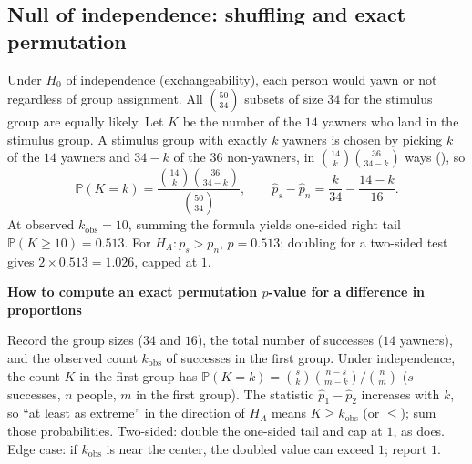 \documentclass[10pt]{scrartcl}
\newenvironment{howto}[1]{\begin{mdframed}[style=howtostyle]{\color{NavyBlue}\textbf{#1}}\par\vspace{2pt}}{\end{mdframed}}
\begin{document}
\subsection{Null of independence: shuffling and exact permutation}

Under $H_0$ of independence (exchangeability), each person would yawn or not regardless of group assignment. All $\binom{50}{34}$ subsets of size $34$ for the stimulus group are equally likely. Let $K$ be the number of the $14$ yawners who land in the stimulus group. A stimulus group with exactly $k$ yawners is chosen by picking $k$ of the $14$ yawners and $34-k$ of the $36$ non-yawners, in $\binom{14}{k}\binom{36}{34-k}$ ways (), so
\[
  \mathbb P(K = k) = \frac{\binom{14}{k}\binom{36}{34-k}}{\binom{50}{34}}, \qquad \hat p_s - \hat p_n = \frac{k}{34} - \frac{14-k}{16}.
\]
At observed $k_{\text{obs}} = 10$, summing the formula yields one-sided right tail $\mathbb P(K \ge 10) = 0.513$. For $H_A\colon p_s > p_n$, $p = 0.513$; doubling for a two-sided test gives $2 \times 0.513 = 1.026$, capped at $1$.

\begin{howto}{How to compute an exact permutation $p$-value for a difference in proportions}
\begin{steps}
  \ii Record the group sizes ($34$ and $16$), the total number of successes ($14$ yawners), and the observed count $k_{\text{obs}}$ of successes in the first group.
  \ii Under independence, the count $K$ in the first group has $\mathbb P(K=k) = \binom{s}{k}\binom{n-s}{m-k}/\binom nm$ ($s$ successes, $n$ people, $m$ in the first group).
  \ii The statistic $\hat p_1 - \hat p_2$ increases with $k$, so ``at least as extreme'' in the direction of $H_A$ means $K \ge k_{\text{obs}}$ (or $\le$); sum those probabilities.
  \ii Two-sided: double the one-sided tail and cap at $1$, as  does.
  \ii Edge case: if $k_{\text{obs}}$ is near the center, the doubled value can exceed $1$; report $1$.
\end{steps}
\end{howto}
\end{document}
